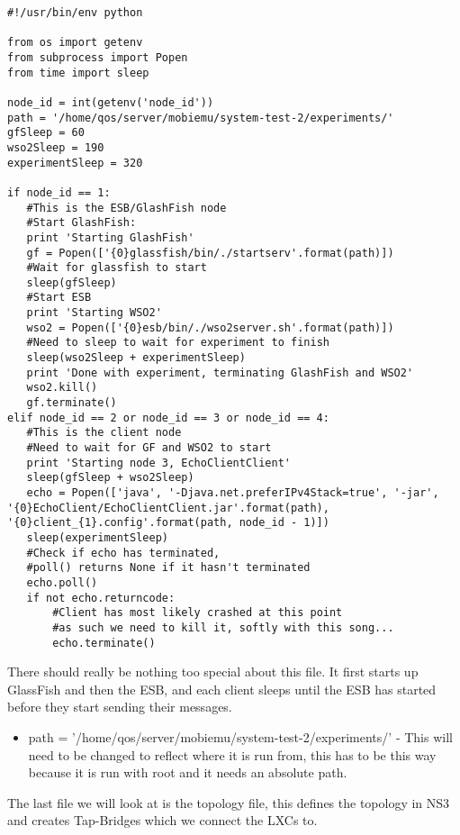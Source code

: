 \lstset{language=Python, style=eclipse}
\begin{lstlisting}[frame=single, caption={System-test-2.py}, label=mobiemu:system-test-2.py, breaklines=true]
#!/usr/bin/env python

from os import getenv
from subprocess import Popen
from time import sleep

node_id = int(getenv('node_id'))
path = '/home/qos/server/mobiemu/system-test-2/experiments/'
gfSleep = 60
wso2Sleep = 190
experimentSleep = 320

if node_id == 1:
   #This is the ESB/GlashFish node
   #Start GlashFish:
   print 'Starting GlashFish'
   gf = Popen(['{0}glassfish/bin/./startserv'.format(path)])
   #Wait for glassfish to start
   sleep(gfSleep)
   #Start ESB
   print 'Starting WSO2'
   wso2 = Popen(['{0}esb/bin/./wso2server.sh'.format(path)])
   #Need to sleep to wait for experiment to finish
   sleep(wso2Sleep + experimentSleep)    
   print 'Done with experiment, terminating GlashFish and WSO2'
   wso2.kill()
   gf.terminate()
elif node_id == 2 or node_id == 3 or node_id == 4:
   #This is the client node
   #Need to wait for GF and WSO2 to start
   print 'Starting node 3, EchoClientClient'
   sleep(gfSleep + wso2Sleep)
   echo = Popen(['java', '-Djava.net.preferIPv4Stack=true', '-jar', '{0}EchoClient/EchoClientClient.jar'.format(path), '{0}client_{1}.config'.format(path, node_id - 1)])
   sleep(experimentSleep)
   #Check if echo has terminated,
   #poll() returns None if it hasn't terminated
   echo.poll()
   if not echo.returncode:
       #Client has most likely crashed at this point
       #as such we need to kill it, softly with this song...
       echo.terminate()
\end{lstlisting}

There should really be nothing too special about this file. It first starts up GlassFish and then the ESB, and each client sleeps until the ESB has started before they start sending their messages.

\begin{itemize}\label{mobiemu:system-test-2.py changes}
\item path = '/home/qos/server/mobiemu/system-test-2/experiments/' - This will need to be changed to reflect where it is run from, this has to be this way because it is run with root and it needs an absolute path.
\end{itemize}

The last file we will look at is the topology file, this defines the topology in NS3 and creates Tap-Bridges which we connect the LXCs to.

